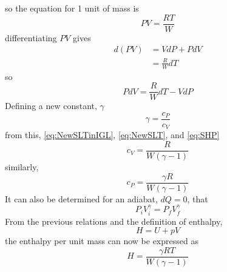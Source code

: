 so the equation for 1 unit of mass is
\begin{equation}\label{eq:IGL1}
PV=\frac{RT}{W}
\end{equation}
differentiating $PV$ gives
\begin{align}
d(PV)&=VdP+PdV\\
&=\frac{R}{W}dT
\end{align}
so
\begin{equation}\label{eq:NewSLTinIGL}
PdV=\frac{R}{W}dT-VdP
\end{equation}
Defining a new constant, $\gamma$
\begin{equation}\label{eq:Gamma}
\gamma=\frac{c_P}{c_V}
\end{equation}%
from this, \ref{eq:NewSLTinIGL}, \ref{eq:NewSLT}, and \ref{eq:SHP}
\begin{equation}\label{eq:GammaincV}
c_V=\frac{R}{W(\gamma-1)}
\end{equation}
similarly,
\begin{equation}\label{eq:GammaincP}
c_P=\frac{\gamma R}{W(\gamma-1)}
\end{equation}
It can also be determined for an adiabat, $dQ=0$, that
\begin{equation}\label{eq:adiabat}
P_iV_i^{\gamma}=P_fV_f^{\gamma}
\end{equation}
From the previous relations and the definition of enthalpy,
\begin{equation}\label{eq:Enthalpy}
H=U+pV
\end{equation}%
the enthalpy per unit mass can now be expressed as
\begin{equation}\label{eq:Enthalpypermass}
H=\frac{\gamma RT}{W(\gamma-1)}
\end{equation}
